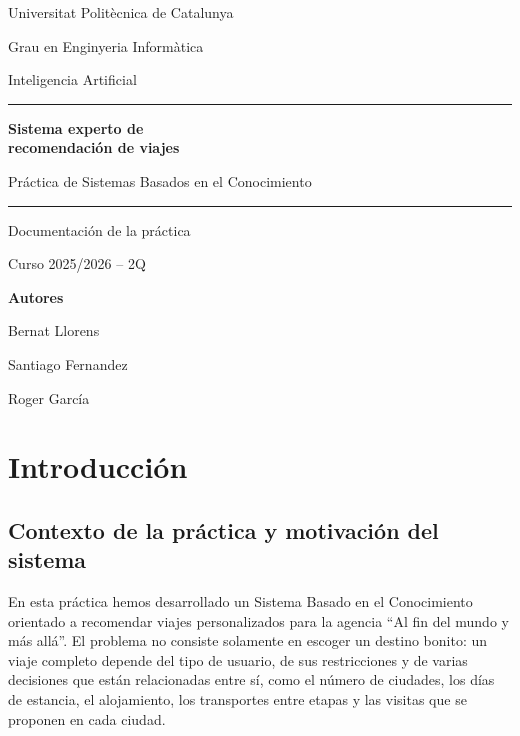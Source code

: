 \documentclass[11pt,a4paper]{article}
\newcommand{\tituloPractica}{Sistema experto de\\[0.18em] recomendaci\'on de viajes}
\newcommand{\subtituloPractica}{Pr\'actica de Sistemas Basados en el Conocimiento}
\newcommand{\asignatura}{Inteligencia Artificial}
\newcommand{\curso}{Curso 2025/2026 -- 2Q}
\begin{document}
\hypersetup{pageanchor=false}
\begin{titlepage}
    \thispagestyle{empty}
    \color{UPCBlue}
    \vspace*{1.2cm}

    {\Large Universitat Polit\`ecnica de Catalunya\par}
    {\large Grau en Enginyeria Inform\`atica\par}
    {\large \asignatura\par}

    \vspace{2.2cm}
    {\color{UPCLightBlue}\rule{\textwidth}{1.2pt}\par}
    \vspace{0.7cm}
    {\Huge\bfseries \tituloPractica\par}
    \vspace{0.45cm}
    {\LARGE \subtituloPractica\par}
    \vspace{0.7cm}
    {\color{UPCLightBlue}\rule{\textwidth}{1.2pt}\par}

    \vspace{2.1cm}
    {\large Documentaci\'on de la pr\'actica\par}
    {\large \curso\par}

    \vfill
    {\large\bfseries Autores\par}
    \vspace{0.35cm}
    {\large Bernat Llorens\par}
    {\large Santiago Fernandez\par}
    {\large Roger Garc\'ia\par}

    \vspace{1.0cm}
\end{titlepage}

\hypersetup{pageanchor=true}
\setcounter{page}{1}
\tableofcontents
\newpage

\setcounter{page}{1}

\section{Introducci\'on}
\subsection{Contexto de la pr\'actica y motivaci\'on del sistema}
En esta pr\'actica hemos desarrollado un Sistema Basado en el Conocimiento
orientado a recomendar viajes personalizados para la agencia ``Al fin del mundo
y m\'as all\'a''. El problema no consiste solamente en escoger un destino bonito:
un viaje completo depende del tipo de usuario, de sus restricciones y de varias
decisiones que est\'an relacionadas entre s\'i, como el n\'umero de ciudades, los
d\'ias de estancia, el alojamiento, los transportes entre etapas y las visitas
que se proponen en cada ciudad.
\end{document}

